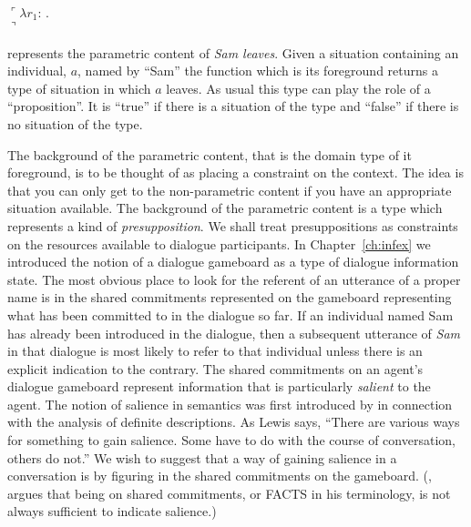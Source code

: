 \begin{ex}
\begin{subex}
\item $\ulcorner\lambda
  r_1$: . \\
\hspace*{2em}
$\urcorner$
 
 
\end{subex} 
\label{ex:paramcontSamLeft}   
\end{ex}

\preveg{} represents the parametric content of \textit{Sam leaves}.
Given a situation containing an individual, $a$, named by ``Sam'' the
function which is its foreground
returns a type of situation in which $a$ leaves.  As usual this type
can play the role of a ``proposition''.  It  is ``true''
if there is a situation of the type and ``false'' if there is no
situation of the type.

The background of the parametric content, that is the domain type
of it foreground,
is to be thought of as placing a constraint on the context.  The idea
is that you can only get to the non-parametric content if you have an
appropriate situation available.  The background of the parametric
content is a type which represents a kind of \textit{presupposition}.  We shall treat
presuppositions as constraints on the resources available to dialogue
participants.  In Chapter~\ref{ch:infex} we introduced the notion of a
dialogue gameboard as a type of dialogue information state.  The most
obvious place to look for the referent of an utterance of a proper
name is in the shared commitments represented on the gameboard
representing what has been committed to in the dialogue so far.  If an
individual named Sam has already been introduced in the dialogue, then
a subsequent utterance of \textit{Sam} in that dialogue is most likely
to refer to that individual unless there is an explicit indication to
the contrary.  The shared commitments on an agent's dialogue gameboard
represent information that is particularly \textit{salient} to the
agent.  The notion of salience in semantics was first introduced by
\cite{Lewis1979} in connection with the analysis of definite
descriptions.  As Lewis says, ``There are various ways for something
to gain salience. Some have to do with the course of conversation,
others do not.''  We wish to suggest that a way of gaining salience in
a conversation is by figuring in the shared commitments on the
gameboard.  (\citealp{Ginzburg2012}, argues that being on shared
commitments, or FACTS in his terminology, is not always sufficient to
indicate salience.)

